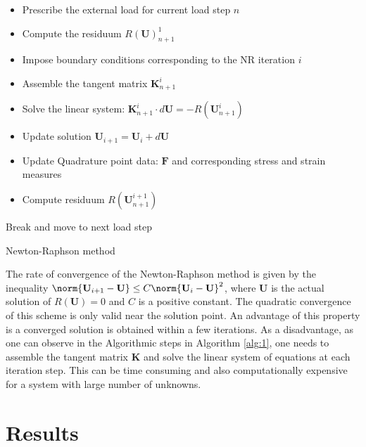 \documentclass[11pt,a4paper,final]{article}
\begin{document}
\begin{algorithm}[H]
\BlankLine
{}
{
	\begin{itemize}
	\item Prescribe the external load for current load step $n$\;
	\item Compute the residuum $R(\mathbf{U})^1_{n+1}$\;
	\end{itemize}

	{
		{
		\begin{itemize}
		\item Impose boundary conditions corresponding to the NR iteration $i$\;
		\item Assemble the tangent matrix $\mathbf{K}^{i}_{n+1}$\;
		\item Solve the linear system: $\mathbf{K}^{i}_{n+1} \cdot d\mathbf{U} = -R(\mathbf{U}^i_{n+1})$\;
		\item Update solution $\mathbf{U}_{i+1} = \mathbf{U}_i + d\mathbf{U}$\;
		\item Update Quadrature point data: $\mathbf{F}$ and corresponding stress and strain measures\;
		\item Compute residuum $R(\mathbf{U}^{i+1}_{n+1})$\;
		\end{itemize}
		}
		{Break and move to next load step\;}			
	}
}
\caption{Newton-Raphson method}
\label{alg:1}
\end{algorithm} \par 

The rate of convergence of the Newton-Raphson method is given by the inequality $\norm{\mathbf{U}_{i+1} - \mathbf{U}} \leq C \norm{\mathbf{U}_i - \mathbf{U}}^2$, where $\mathbf{U}$ is the actual solution of $R(\mathbf{U}) = 0$ and $C$ is a positive constant. The quadratic convergence of this scheme is only valid near the solution point. An advantage of this property is a converged solution is obtained within a few iterations. As a disadvantage, as one can observe in the Algorithmic steps in Algorithm \eqref{alg:1}, one needs to assemble the tangent matrix $\mathbf{K}$ and solve the linear system of equations at each iteration step. This can be time consuming and also computationally expensive for a system with large number of unknowns.  

\section{Results}


\newpage
\printbibliography
\end{document}

